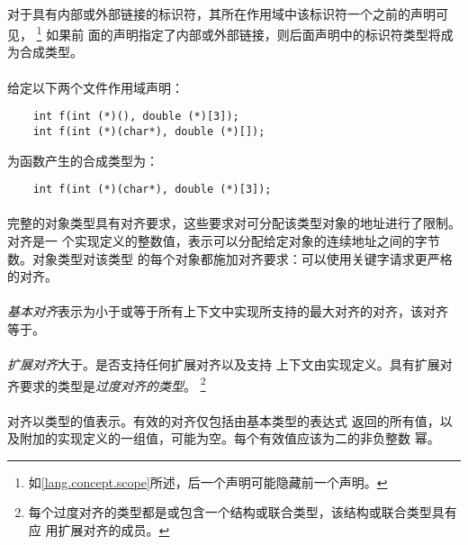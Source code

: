 \paragraph{}
对于具有内部或外部链接的标识符，其所在作用域中该标识符一个之前的声明可见，
\footnote{如\ref{lang.concept.scope}所述，后一个声明可能隐藏前一个声明。} 如果前
面的声明指定了内部或外部链接，则后面声明中的标识符类型将成为合成类型。


\paragraph{}
\ex* 给定以下两个文件作用域声明：
\begin{lstlisting}
    int f(int (*)(), double (*)[3]);
    int f(int (*)(char*), double (*)[]);
\end{lstlisting}
为函数产生的合成类型为：
\begin{lstlisting}
    int f(int (*)(char*), double (*)[3]);
\end{lstlisting}

\paragraph{}
完整的对象类型具有对齐要求，这些要求对可分配该类型对象的地址进行了限制。对齐是一
个实现定义的整数值，表示可以分配给定对象的连续地址之间的字节数。对象类型对该类型
的每个对象都施加对齐要求：可以使用关键字请求更严格的对齐。

\paragraph{}
\textit{基本对齐}表示为小于或等于所有上下文中实现所支持的最大对齐的对齐，该对齐
等于。

\paragraph{}
\textit{扩展对齐}大于。是否支持任何扩展对齐以及支持
上下文由实现定义。具有扩展对齐要求的类型是\textit{过度对齐的类型}。
\footnote{每个过度对齐的类型都是或包含一个结构或联合类型，该结构或联合类型具有应
用扩展对齐的成员。}

\paragraph{}
对齐以类型的值表示。有效的对齐仅包括由基本类型的表达式
返回的所有值，以及附加的实现定义的一组值，可能为空。每个有效值应该为二的非负整数
幂。

